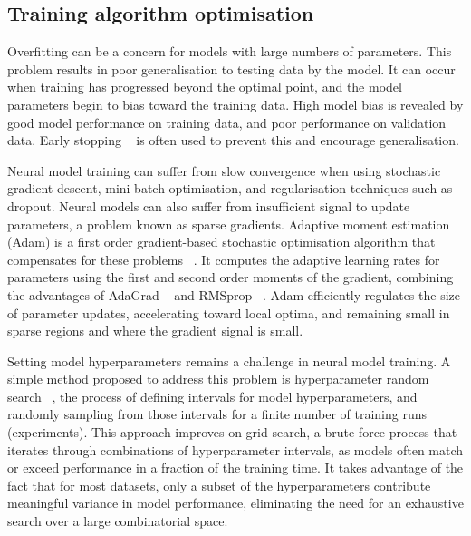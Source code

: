 \subsection{Training algorithm optimisation} 

Overfitting can be a concern for models with large numbers of parameters. This problem results in poor generalisation to testing data by the model. It can occur when training has progressed beyond the optimal point, and the model parameters begin to bias toward the training data. High model bias is revealed by good model performance on training data, and poor performance on validation data. Early stopping \unskip~\citep{prechelt1998early} is often used to prevent this and encourage generalisation. \par

\noindent Neural model training can suffer from slow convergence when using stochastic gradient descent, mini-batch optimisation, and regularisation techniques such as dropout. Neural models can also suffer from insufficient signal to update parameters, a problem known as sparse gradients. Adaptive moment estimation (Adam) is a first order gradient-based stochastic optimisation algorithm that compensates for these problems \unskip ~\citep{kingma2014adam}. It computes the adaptive learning rates for parameters using the first and second order moments of the gradient, combining the advantages of AdaGrad ~\citep{duchi2011adaptive} and RMSprop ~\citep{tieleman2012lecture}. Adam efficiently regulates the size of parameter updates, accelerating toward local optima, and remaining small in sparse regions and where the gradient signal is small. \par

\noindent Setting model hyperparameters remains a challenge in neural model training. A simple method proposed to address this problem is hyperparameter random search \unskip ~\citep{bergstra2012random}, the process of defining intervals for model hyperparameters, and randomly sampling from those intervals for a finite number of training runs (experiments). This approach improves on grid search, a brute force process that iterates through combinations of hyperparameter intervals, as models often match or exceed performance in a fraction of the training time. It takes advantage of the fact that for most datasets, only a subset of the hyperparameters contribute meaningful variance in model performance, eliminating the need for an exhaustive search over a large combinatorial space. \par

